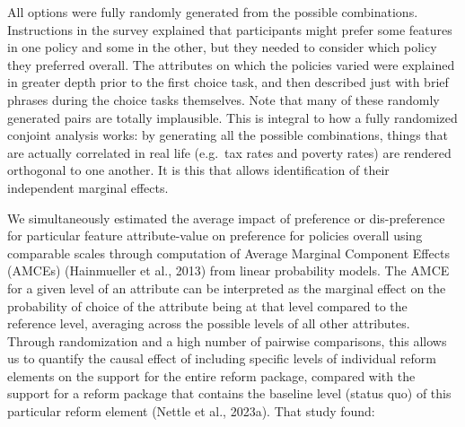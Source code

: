 \documentclass[
  letterpaper,
  DIV=11,
  numbers=noendperiod]{scrartcl}
\begin{document}
All options were fully randomly generated from the possible
combinations. Instructions in the survey explained that participants
might prefer some features in one policy and some in the other, but they
needed to consider which policy they preferred overall. The attributes
on which the policies varied were explained in greater depth prior to
the first choice task, and then described just with brief phrases during
the choice tasks themselves. Note that many of these randomly generated
pairs are totally implausible. This is integral to how a fully
randomized conjoint analysis works: by generating all the possible
combinations, things that are actually correlated in real life (e.g.~tax
rates and poverty rates) are rendered orthogonal to one another. It is
this that allows identification of their independent marginal effects.

We simultaneously estimated the average impact of preference or
dis-preference for particular feature attribute-value on preference for
policies overall using comparable scales through computation of Average
Marginal Component Effects (AMCEs) (Hainmueller et al., 2013) from
linear probability models. The AMCE for a given level of an attribute
can be interpreted as the marginal effect on the probability of choice
of the attribute being at that level compared to the reference level,
averaging across the possible levels of all other attributes. Through
randomization and a high number of pairwise comparisons, this allows us
to quantify the causal effect of including specific levels of individual
reform elements on the support for the entire reform package, compared
with the support for a reform package that contains the baseline level
(status quo) of this particular reform element (Nettle et al., 2023a).
That study found:
\end{document}
